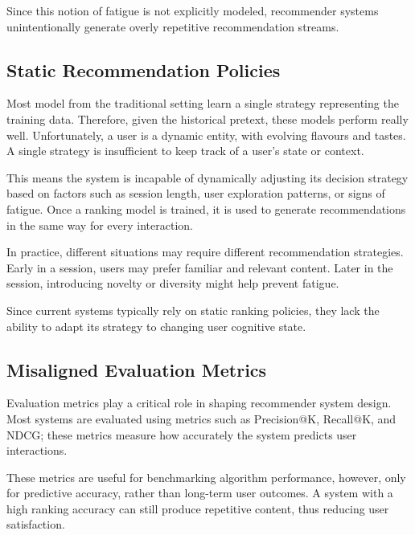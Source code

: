 Since this notion of fatigue is not explicitly modeled, recommender systems 
unintentionally generate overly repetitive recommendation streams.


\subsection{Static Recommendation Policies}

Most model from the traditional setting learn a single strategy representing the training data.
Therefore, given the historical pretext, these models perform really well.
Unfortunately, a user is a dynamic entity, with evolving flavours and tastes.
A single strategy is insufficient to keep track of a user's state or context.

This means the system is incapable of dynamically adjusting its decision strategy 
based on factors such as session length, user exploration patterns, or signs of fatigue.
Once a ranking model is trained, it is used to generate recommendations in the same way for every interaction.

In practice, different situations may require different recommendation strategies.
Early in a session, users may prefer familiar and relevant content.
Later in the session, introducing novelty or diversity might help prevent fatigue.

Since current systems typically rely on static ranking policies, they lack 
the ability to adapt its strategy to changing user cognitive state.


\subsection{Misaligned Evaluation Metrics}

Evaluation metrics play a critical role in shaping recommender system design.
Most systems are evaluated using metrics such as Precision@K, Recall@K, and 
NDCG; these metrics measure how accurately the system predicts user interactions.

These metrics are useful for benchmarking algorithm performance, however, 
only for predictive accuracy, rather than long-term user outcomes.
A system with a high ranking accuracy can still produce 
repetitive content, thus reducing user satisfaction.

